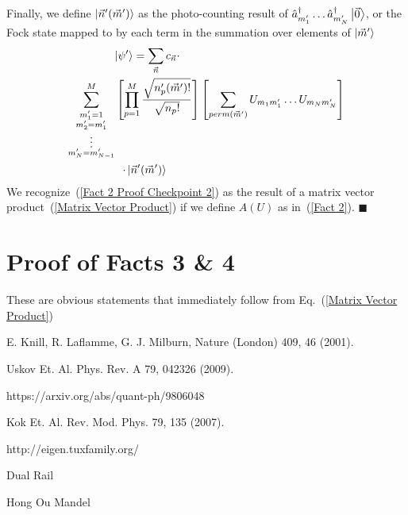 \documentclass[aps,pra,twocolumn,showpacs,superscriptaddress,floatfix,10pt]{revtex4}
\begin{document}
Finally, we define $\ket{\vec{n}^\prime(\vec{m}^\prime)}$ as the photo-counting result of $\hat{a}_{m_1^\prime}^\dagger \dots \hat{a}_{m_N^\prime}^\dagger \ket{\vec{0}}$, or the Fock state mapped to by each term in the summation over elements of $\ket{\vec{m}^\prime}$
\begin{eqnarray}
\label{Fact 2 Proof Checkpoint 2}
\small \ket{\psi^\prime} = \sum_{\vec{n}} c_{\vec{n}}  \cdot \quad \quad \quad \quad \quad \quad \quad \quad \quad \quad \quad \quad \quad \quad \quad \quad  \\ \sum^M_{\substack{m_1^\prime = 1\\
		m_2^\prime = m_1^\prime\\
		\vdots \\
		m_N^\prime = m_{N-1}^\prime}}
\left[ \prod_{p=1}^{M} \frac{\sqrt{n_p^\prime(\vec{m}^\prime) !}}{ \sqrt{n_p !}} \right] \left[ \sum_{perm(\vec{m}^\prime)} U_{m_1 m_1^\prime} \dots U_{m_N m_N^\prime} \right] \nonumber \\
\cdot \ket{\vec{n}^\prime (\vec{m}^\prime) } \quad \quad \quad \quad \quad \quad \quad \quad \quad \quad \quad \quad \quad \quad \quad \quad \nonumber
\end{eqnarray}
We recognize~(\ref{Fact 2 Proof Checkpoint 2}) as the result of a matrix vector product~(\ref{Matrix Vector Product}) if we define $A(U)$ as in~(\ref{Fact 2}).  $ \blacksquare $
\section{Proof of Facts 3 \& 4}
These are obvious statements that immediately follow from Eq.~(\ref{Matrix Vector Product})

\begin{thebibliography}{99}

  E. Knill, R. Laflamme, G. J. Milburn, Nature (London) 409, 46 (2001).

 Uskov Et. Al.
Phys. Rev. A 79, 042326 (2009).

 https://arxiv.org/abs/quant-ph/9806048

 Kok Et. Al.
Rev. Mod. Phys. 79, 135 (2007).

 http://eigen.tuxfamily.org/

 Dual Rail

 Hong Ou Mandel

\end{thebibliography}
\end{document}
